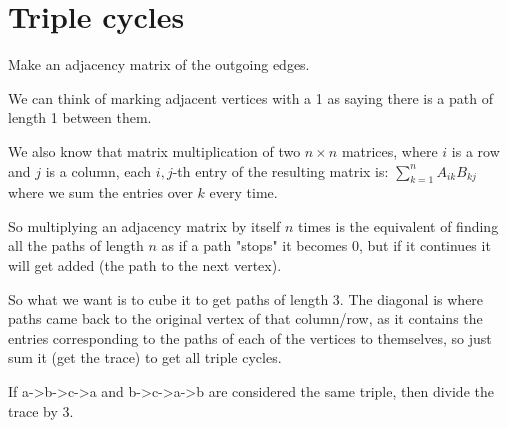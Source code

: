 \documentclass[11pt,letterpaper]{article}
\begin{document}
	\section{Triple cycles}
		Make an adjacency matrix of the outgoing edges.
		
		We can think of marking adjacent vertices with a 1 as saying there is a path of length 1 between them.
		
		We also know that matrix multiplication of two $n \times n$ matrices, where $i$ is a row and $j$ is a column, each $i,j$-th entry of the resulting matrix is:
		$\sum_{k=1}^{n}A_{ik}B_{kj}$
		where we sum the entries over $k$ every time.
		
		So multiplying an adjacency matrix by itself $n$ times is the equivalent of finding all the paths of length $n$ as if a path "stops" it becomes 0, but if it continues it will get added (the path to the next vertex).
		
		So what we want is to cube it to get paths of length 3.
		The diagonal is where paths came back to the original vertex of that column/row, as it contains the entries corresponding to the paths of each of the vertices to themselves, so just sum it (get the trace) to get all triple cycles.
		
		If a->b->c->a and b->c->a->b are considered the same triple, then divide the trace by 3.
	
\end{document}

